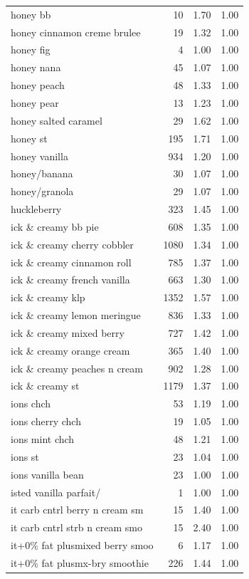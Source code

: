 \begin{table}
\begin{tabular}{lrrr}
honey bb & 10 & 1.70 & 1.00 \\
honey cinnamon creme brulee & 19 & 1.32 & 1.00 \\
honey fig & 4 & 1.00 & 1.00 \\
honey nana & 45 & 1.07 & 1.00 \\
honey peach & 48 & 1.33 & 1.00 \\
honey pear & 13 & 1.23 & 1.00 \\
honey salted caramel & 29 & 1.62 & 1.00 \\
honey st & 195 & 1.71 & 1.00 \\
honey vanilla & 934 & 1.20 & 1.00 \\
honey/banana & 30 & 1.07 & 1.00 \\
honey/granola & 29 & 1.07 & 1.00 \\
huckleberry & 323 & 1.45 & 1.00 \\
ick \& creamy bb pie & 608 & 1.35 & 1.00 \\
ick \& creamy cherry cobbler & 1080 & 1.34 & 1.00 \\
ick \& creamy cinnamon roll & 785 & 1.37 & 1.00 \\
ick \& creamy french vanilla & 663 & 1.30 & 1.00 \\
ick \& creamy klp & 1352 & 1.57 & 1.00 \\
ick \& creamy lemon meringue & 836 & 1.33 & 1.00 \\
ick \& creamy mixed berry & 727 & 1.42 & 1.00 \\
ick \& creamy orange cream & 365 & 1.40 & 1.00 \\
ick \& creamy peaches n cream & 902 & 1.28 & 1.00 \\
ick \& creamy st & 1179 & 1.37 & 1.00 \\
ions chch & 53 & 1.19 & 1.00 \\
ions cherry chch & 19 & 1.05 & 1.00 \\
ions mint chch & 48 & 1.21 & 1.00 \\
ions st & 23 & 1.04 & 1.00 \\
ions vanilla bean & 23 & 1.00 & 1.00 \\
isted vanilla parfait/ & 1 & 1.00 & 1.00 \\
it carb cntrl berry n cream sm & 15 & 1.40 & 1.00 \\
it carb cntrl strb n cream smo & 15 & 2.40 & 1.00 \\
it+0\% fat plusmixed berry smoo & 6 & 1.17 & 1.00 \\
it+0\% fat plusmx-bry smoothie & 226 & 1.44 & 1.00 \\

\end{tabular}
\end{table}
